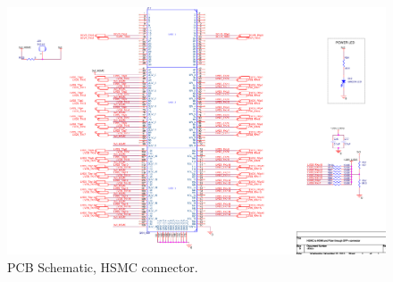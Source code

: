 \documentclass[main.tex]{subfiles}
\begin{document}
\begin{figure} %
\begin{center}
\includegraphics[width=1\linewidth]{../img/pcb_sch3}
\caption{PCB Schematic, HSMC connector.}
\label{fig:pcb_sch3}
\end{center}
\end{figure}
\end{document}
